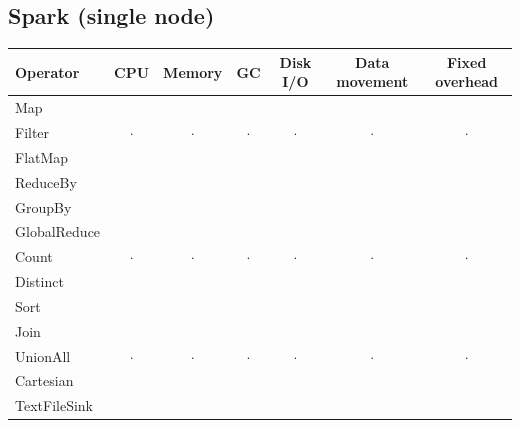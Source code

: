 \documentclass[11pt,a4paper]{article}
\providecommand{\high}{\CIRCLE}\providecommand{\some}{\LEFTcircle}\providecommand{\low}{\Circle}
\begin{document}
\subsection{Spark (single node)}
\begin{center}\small\begin{tabular}{lcccccc}\toprule

Operator & CPU & Memory & GC & Disk I/O & Data movement & Fixed overhead\\\midrule

Map & \high & \low & \low & \low & \low & \low\\

Filter & $\cdot$ & $\cdot$ & $\cdot$ & $\cdot$ & $\cdot$ & $\cdot$\\

FlatMap & \high & \low & \low & \low & \low & \low\\

ReduceBy & \high & \some & \low & \low & \low & \high\\

GroupBy & \high & \high & \low & \low & \high & \some\\

GlobalReduce & \some & \low & \low & \low & \low & \low\\

Count & $\cdot$ & $\cdot$ & $\cdot$ & $\cdot$ & $\cdot$ & $\cdot$\\

Distinct & \high & \some & \low & \low & \low & \high\\

Sort & \high & \high & \low & \low & \high & \high\\

Join & \high & \high & \low & \low & \high & \some\\

UnionAll & $\cdot$ & $\cdot$ & $\cdot$ & $\cdot$ & $\cdot$ & $\cdot$\\

Cartesian & \high & \low & \low & \low & \low & \some\\

TextFileSink & \some & \low & \low & \high & \low & \high\\
\bottomrule\end{tabular}\end{center}
\end{document}
